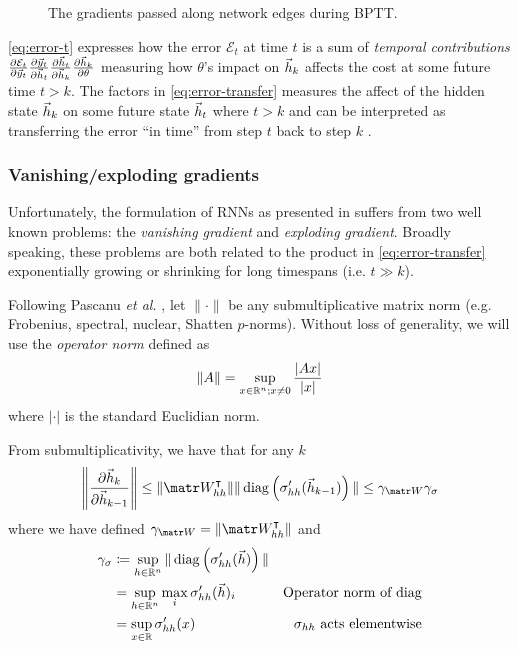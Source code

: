 \begin{figure}[htpb]
    \centering
    
    \caption{The gradients passed along network edges during BPTT.}
    \label{fig:rnn-bptt}
\end{figure}

\autoref{eq:error-t} expresses how the error $\mathcal{E}_t$ at time $t$ is a sum
of \emph{temporal contributions} $
\frac{\partial \mathcal{E}_t}{\partial \vec{y}_t}
\frac{\partial \vec{y}_t}{\partial \vec{h}_t}
\frac{\partial \vec{h}_t}{\partial \vec{h}_k}
\frac{\partial \vec{h}_k}{\partial \theta}$
measuring how $\theta$'s impact on $\vec{h}_k$ affects the cost at some future
time $t > k$. The factors in \autoref{eq:error-transfer} measures the affect
of the hidden state $\vec{h}_k$ on some future state $\vec{h}_t$ where $t > k$
and can be interpreted as transferring the error ``in time'' from step $t$ back
to step $k$ \cite{Pascanu2012}.

\subsubsection{Vanishing/exploding gradients}

Unfortunately, the formulation of RNNs as presented in 
suffers from two well known problems: the \emph{vanishing gradient} and
\emph{exploding gradient}\cite{Bengio1994}. Broadly speaking,
these problems are both related to the product in \autoref{eq:error-transfer}
exponentially growing or shrinking for long timespans (i.e. $t \gg k$).

Following Pascanu \textit{et al.} \cite{Pascanu2012}, let $\| \cdot \|$ be any
submultiplicative matrix norm (e.g. Frobenius, spectral, nuclear, Shatten
$p$-norms). Without loss of generality, we will use the \emph{operator norm}
defined as
\begin{equation}
    \| A \| = \sup_{x \in \mathbb{R}^n; x \neq 0} \frac{|A x|}{|x|}
\end{equation}
where $|\cdot|$ is the standard Euclidian norm.

From submultiplicativity, we have that for any $k$
\begin{equation}
    \left\| \frac{\pd \h_k}{\pd \h_{k-1}} \right\|
    \leq \| \W_{hh}^\tp \| \| \diag\left( \sigma_{hh}'(\h_{k-1}) \right) \|
    \leq \gamma_{\W} \gamma_\sigma
\end{equation}
where we have defined $\gamma_{\W} = \| \W_{hh}^\tp \|$ and
\begin{align}
    \gamma_\sigma
    &\coloneqq \sup_{h \in \mathbb{R}^n} \| \operatorname*{diag} \left( \sigma_{hh}'(\vec{h}) \right) \|  &\\
    &= \sup_{h \in \mathbb{R}^n} \max_i \sigma_{hh}'(\vec{h})_i &\mbox{Operator norm of diag} \\
    &= \sup_{x \in \mathbb{R}} \sigma_{hh}'(x) &\mbox{$\sigma_{hh}$ acts elementwise}
\end{align}

